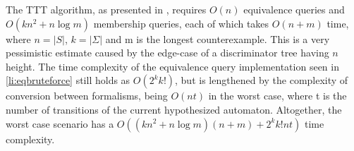 The TTT algorithm, as presented in \cite{10.1007/978-3-319-11164-3_26}, requires $O(n)$ equivalence queries and $O(kn^2+n\log m)$ membership queries, each of which takes $O(n+m)$ time, where $n=|S|$, $k=|\Sigma|$ and m is the longest counterexample. This is a very pessimistic estimate caused by the edge-case of a discriminator tree having $n$ height. The time complexity of the equivalence query implementation seen in \ref{li:eqbruteforce} still holds as $O(2^kk!)$, but is lengthened by the complexity of conversion between formalisms, being $O(nt)$ in the worst case, where t is the number of transitions of the current hypothesized automaton. Altogether, the worst case scenario has a $O((kn^2+n\log m)(n+m) + 2^kk!nt)$ time complexity.
